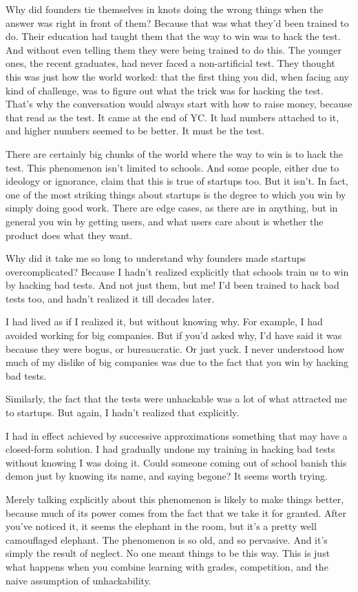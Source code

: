 Why did founders tie themselves in knots doing the wrong things when the
answer was right in front of them? Because that was what they'd been
trained to do. Their education had taught them that the way to win was
to hack the test. And without even telling them they were being trained
to do this. The younger ones, the recent graduates, had never faced a
non-artificial test. They thought this was just how the world worked:
that the first thing you did, when facing any kind of challenge, was to
figure out what the trick was for hacking the test. That's why the
conversation would always start with how to raise money, because that
read as the test. It came at the end of YC. It had numbers attached to
it, and higher numbers seemed to be better. It must be the test.

There are certainly big chunks of the world where the way to win is to
hack the test. This phenomenon isn't limited to schools. And some
people, either due to ideology or ignorance, claim that this is true of
startups too. But it isn't. In fact, one of the most striking things
about startups is the degree to which you win by simply doing good work.
There are edge cases, as there are in anything, but in general you win
by getting users, and what users care about is whether the product does
what they want.

Why did it take me so long to understand why founders made startups
overcomplicated? Because I hadn't realized explicitly that schools train
us to win by hacking bad tests. And not just them, but me! I'd been
trained to hack bad tests too, and hadn't realized it till decades
later.

I had lived as if I realized it, but without knowing why. For example, I
had avoided working for big companies. But if you'd asked why, I'd have
said it was because they were bogus, or bureaucratic. Or just yuck. I
never understood how much of my dislike of big companies was due to the
fact that you win by hacking bad tests.

Similarly, the fact that the tests were unhackable was a lot of what
attracted me to startups. But again, I hadn't realized that explicitly.

I had in effect achieved by successive approximations something that may
have a closed-form solution. I had gradually undone my training in
hacking bad tests without knowing I was doing it. Could someone coming
out of school banish this demon just by knowing its name, and saying
begone? It seems worth trying.

Merely talking explicitly about this phenomenon is likely to make things
better, because much of its power comes from the fact that we take it
for granted. After you've noticed it, it seems the elephant in the room,
but it's a pretty well camouflaged elephant. The phenomenon is so old,
and so pervasive. And it's simply the result of neglect. No one meant
things to be this way. This is just what happens when you combine
learning with grades, competition, and the naive assumption of
unhackability.

